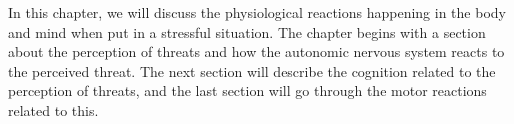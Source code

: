 In this chapter, we will discuss the physiological reactions happening in the body and mind when put in a stressful situation. The chapter begins with a section about the perception of threats and how the autonomic nervous system reacts to the perceived threat. The next section will describe the cognition related to the perception of threats, and the last section will go through the motor reactions related to this.